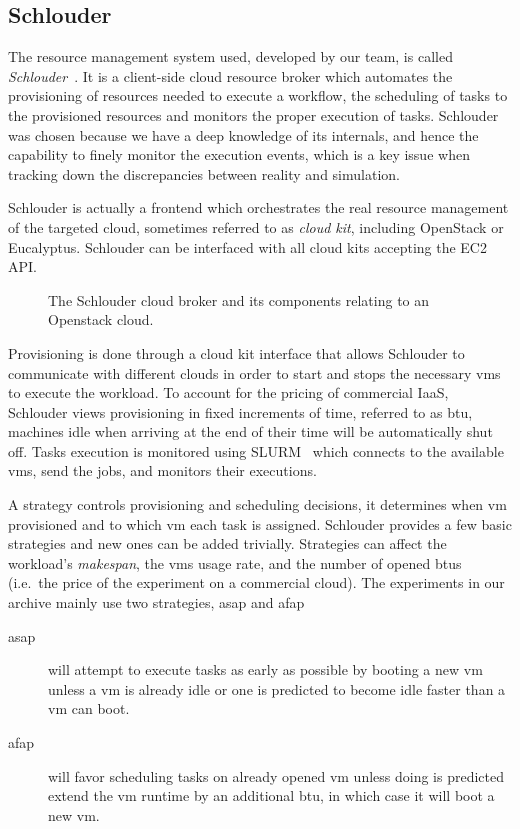 \subsection{Schlouder}

The  resource  management  system  used,   developed  by  our  team,  is  called
\emph{Schlouder}~\cite{Michon17}.   It is  a client-side  cloud resource  broker
which automates the provisioning of resources  needed to execute a workflow, the
scheduling  of  tasks to  the  provisioned  resources  and monitors  the  proper
execution of tasks. Schlouder was chosen because we have a deep knowledge of its
internals,  and hence  the capability  to finely  monitor the  execution events,
which is  a key issue when  tracking down the discrepancies  between reality and
simulation.

Schlouder is actually a frontend which orchestrates the real resource management
of  the targeted  cloud, sometimes  referred to  as \emph{cloud  kit}, including
OpenStack  or  Eucalyptus. Schlouder  can  be  interfaced  with all  cloud  kits
accepting the EC2 API.

%
\begin{figure}
	\centering
	
	\caption{The Schlouder cloud broker and its components relating to an
	Openstack cloud.}
\end{figure}
%
Provisioning is  done through  a cloud  kit interface  that allows  Schlouder to
communicate with  different clouds  in order  to start  and stops  the necessary
\acp{vm} to  execute the  workload.  To  account for  the pricing  of commercial
IaaS, Schlouder views  provisioning in fixed increments of time,  referred to as
\ac{btu},  machines  idle  when arriving  at  the  end  of  their time  will  be
automatically shut off.
%
Tasks execution  is monitored using  SLURM~\cite{YooJG03} which connects  to the
available \acp{vm}, send the jobs, and monitors their executions.

A strategy controls provisioning and scheduling decisions, it determines when
\ac{vm} provisioned and to which \ac{vm} each task is assigned. Schlouder
provides a few basic strategies and new ones can be added trivially. Strategies
can affect the workload's \emph{makespan}, the \acp{vm} usage rate, and the
number of opened \acp{btu} (i.e.\ the price of the experiment on a commercial
cloud). The experiments in our archive mainly use two strategies, \ac{asap} and
\ac{afap}

\begin{description}
	\item[\ac{asap}] will attempt to execute tasks as early as possible by
		booting a new \ac{vm} unless a \ac{vm} is already idle or one is
		predicted to become idle faster than a \ac{vm} can boot.
	\item[\ac{afap}] will favor scheduling tasks on already opened \ac{vm}
		unless doing is predicted extend the \ac{vm} runtime by an
		additional \ac{btu}, in which case it will boot a new \ac{vm}.
\end{description}

